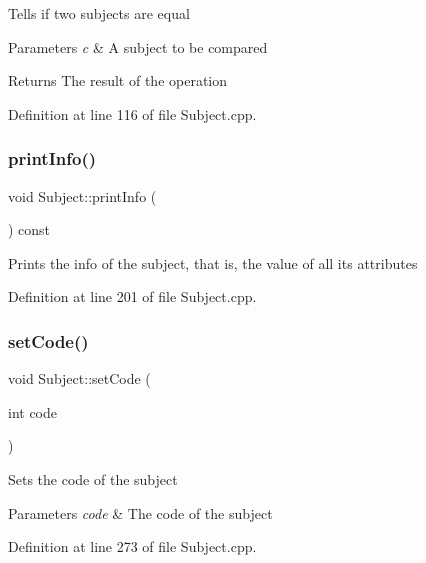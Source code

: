 Tells if two subjects are equal 
\begin{DoxyParams}{Parameters}
{\em c} & A subject to be compared \\
\hline
\end{DoxyParams}
\begin{DoxyReturn}{Returns}
The result of the operation 
\end{DoxyReturn}


Definition at line 116 of file Subject.\+cpp.

\mbox{\label{classSubject_af96ca779862097e5cc1bb2b457ba08a2}} 
\subsubsection{\texorpdfstring{print\+Info()}{printInfo()}}
{\footnotesize\ttfamily void Subject\+::print\+Info (\begin{DoxyParamCaption}{ }\end{DoxyParamCaption}) const}

Prints the info of the subject, that is, the value of all its attributes 

Definition at line 201 of file Subject.\+cpp.

\mbox{\label{classSubject_aecdbb1db33e14fd380bcb607a33c86e8}} 
\subsubsection{\texorpdfstring{set\+Code()}{setCode()}}
{\footnotesize\ttfamily void Subject\+::set\+Code (\begin{DoxyParamCaption}\item[{int}]{code }\end{DoxyParamCaption})}

Sets the code of the subject 
\begin{DoxyParams}{Parameters}
{\em code} & The code of the subject \\
\hline
\end{DoxyParams}


Definition at line 273 of file Subject.\+cpp.

\mbox{\label{classSubject_ab2b31d04366a75b679f1eec77783e0bf}} 
